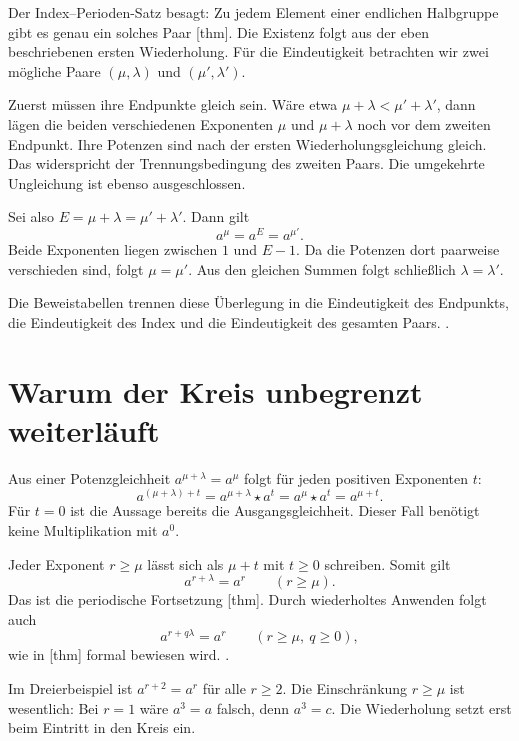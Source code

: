 Der Index--Perioden-Satz besagt: Zu jedem Element einer endlichen
Halbgruppe gibt es genau ein solches Paar
[thm].
Die Existenz folgt aus der eben beschriebenen ersten Wiederholung.
Für die Eindeutigkeit betrachten wir zwei mögliche Paare
\((\mu,\lambda)\) und \((\mu',\lambda')\).

Zuerst müssen ihre Endpunkte gleich sein. Wäre etwa
\(\mu+\lambda<\mu'+\lambda'\), dann lägen die beiden verschiedenen
Exponenten \(\mu\) und \(\mu+\lambda\) noch vor dem zweiten Endpunkt.
Ihre Potenzen sind nach der ersten Wiederholungsgleichung gleich.
Das widerspricht der Trennungsbedingung des zweiten Paars.
Die umgekehrte Ungleichung ist ebenso ausgeschlossen.

Sei also \(E=\mu+\lambda=\mu'+\lambda'\).
Dann gilt
\[
 a^\mu=a^E=a^{\mu'}.
\]
Beide Exponenten liegen zwischen \(1\) und \(E-1\).
Da die Potenzen dort paarweise verschieden sind, folgt \(\mu=\mu'\).
Aus den gleichen Summen folgt schließlich \(\lambda=\lambda'\).

Die Beweistabellen trennen diese Überlegung in die Eindeutigkeit
des Endpunkts, die Eindeutigkeit des Index und die Eindeutigkeit
des gesamten Paars.
.

\section*{Warum der Kreis unbegrenzt weiterläuft}

Aus einer Potenzgleichheit
\(a^{\mu+\lambda}=a^\mu\) folgt für jeden positiven Exponenten \(t\):
\[
 a^{(\mu+\lambda)+t}
 =a^{\mu+\lambda}\star a^t
 =a^\mu\star a^t
 =a^{\mu+t}.
\]
Für \(t=0\) ist die Aussage bereits die Ausgangsgleichheit.
Dieser Fall benötigt keine Multiplikation mit \(a^0\).

Jeder Exponent \(r\geq\mu\) lässt sich als \(\mu+t\) mit \(t\geq0\)
schreiben. Somit gilt
\[
 \boxed{a^{r+\lambda}=a^r\qquad(r\geq\mu).}
\]
Das ist die periodische Fortsetzung
[thm].
Durch wiederholtes Anwenden folgt auch
\[
 a^{r+q\lambda}=a^r\qquad(r\geq\mu,\ q\geq0),
\]
wie in [thm]
formal bewiesen wird.
.

Im Dreierbeispiel ist \(a^{r+2}=a^r\) für alle \(r\geq2\).
Die Einschränkung \(r\geq\mu\) ist wesentlich:
Bei \(r=1\) wäre \(a^3=a\) falsch, denn \(a^3=c\).
Die Wiederholung setzt erst beim Eintritt in den Kreis ein.

